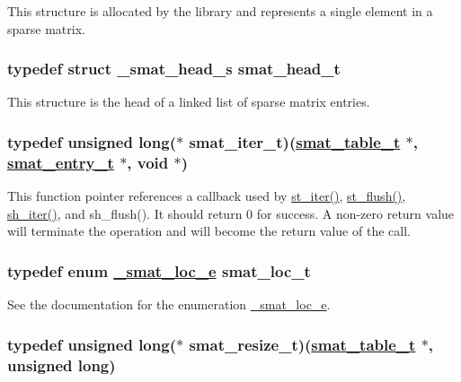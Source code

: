 This structure is allocated by the library and represents a single element in a sparse matrix. \hypertarget{group__dbprim__smat_a1}{
\subsubsection[smat\_\-head\_\-t]{\setlength{\rightskip}{0pt plus 5cm}typedef struct \_\-smat\_\-head\_\-s smat\_\-head\_\-t}}
\label{group__dbprim__smat_a1}


This structure is the head of a linked list of sparse matrix entries. \hypertarget{group__dbprim__smat_a4}{
\subsubsection[smat\_\-iter\_\-t]{\setlength{\rightskip}{0pt plus 5cm}typedef unsigned long($\ast$ smat\_\-iter\_\-t)(\hyperlink{group__dbprim__smat_a0}{smat\_\-table\_\-t} $\ast$, \hyperlink{group__dbprim__smat_a2}{smat\_\-entry\_\-t} $\ast$, void $\ast$)}}
\label{group__dbprim__smat_a4}


This function pointer references a callback used by \hyperlink{group__dbprim__smat_a13}{st\_\-iter()}, \hyperlink{group__dbprim__smat_a14}{st\_\-flush()}, \hyperlink{group__dbprim__smat_a20}{sh\_\-iter()}, and sh\_\-flush(). It should return 0 for success. A non-zero return value will terminate the operation and will become the return value of the call. \hypertarget{group__dbprim__smat_a6}{
\subsubsection[smat\_\-loc\_\-t]{\setlength{\rightskip}{0pt plus 5cm}typedef enum \hyperlink{group__dbprim__smat_a48}{\_\-smat\_\-loc\_\-e} smat\_\-loc\_\-t}}
\label{group__dbprim__smat_a6}


See the documentation for the enumeration \hyperlink{group__dbprim__smat_a48}{\_\-smat\_\-loc\_\-e}. \hypertarget{group__dbprim__smat_a3}{
\subsubsection[smat\_\-resize\_\-t]{\setlength{\rightskip}{0pt plus 5cm}typedef unsigned long($\ast$ smat\_\-resize\_\-t)(\hyperlink{group__dbprim__smat_a0}{smat\_\-table\_\-t} $\ast$, unsigned long)}}
\label{group__dbprim__smat_a3}


